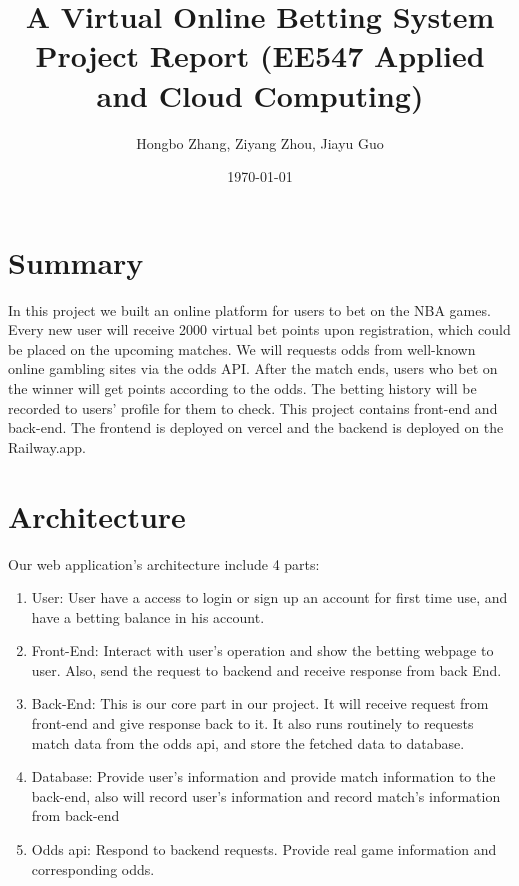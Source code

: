 \documentclass[singlecolumn]{article}
\begin{document}
\title{A Virtual Online Betting System\\
\large Project Report (EE547 Applied and Cloud Computing)}
\author{Hongbo Zhang, Ziyang Zhou, Jiayu Guo}
\date{\today}
\maketitle


\section{Summary}

In this project we built an online platform for users to bet on the NBA games. Every new user will receive 2000 virtual bet points upon registration, which could be placed on the upcoming matches. We will requests odds from well-known online gambling sites via the odds API. After the match ends, users who bet on the winner will get points according to the odds. The betting history will be recorded to users’ profile for them to check. This project contains front-end and back-end. The frontend is deployed on vercel and the backend is deployed on the Railway.app.


\section{Architecture}

Our web application's architecture include 4 parts:
\begin{enumerate}
    \item User: User have a access to login or sign up an account for first time use, and have a betting balance in his account.
    \item Front-End: Interact with user's operation and show the betting webpage to user. Also, send the request to backend and receive response from back End.
    \item Back-End: This is our core part in our project. It will receive request from front-end and give response back to it. It also runs routinely to requests match data from the odds api, and store the fetched data to database.
    \item Database: Provide user's information and provide match information to the back-end, also will record user's information and record match's information from back-end
    \item Odds api: Respond to backend requests. Provide real game information and corresponding odds.
\end{enumerate}
\end{document}
